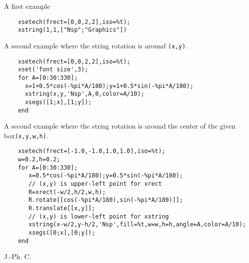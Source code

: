 \begin{examples}

\noindent A first example

  \begin{Verbatim}
    xsetech(frect=[0,0,2,2],iso=%t);
    xstring(1,1,["Nsp";"Graphics"])
  \end{Verbatim}

\noindent A second example where the string rotation is around \verb!(x,y)!.

  \begin{Verbatim}
    xsetech(frect=[0,0,2,2],iso=%t);
    xset('font size',3);
    for A=[0:30:330];
      x=1+0.5*cos(-%pi*A/180);y=1+0.5*sin(-%pi*A/180);
      xstring(x,y,'Nsp',A,0,color=A/10);
      xsegs([1;x],[1;y]);
    end
  \end{Verbatim}

\noindent A second example where the string rotation is around the center of the
  given box\verb!(x,y,w,h)!.

  \begin{Verbatim}
    xsetech(frect=[-1.0,-1.0,1.0,1.0],iso=%t);
    w=0.2,h=0.2;
    for A=[0:30:330];
       x=0.5*cos(-%pi*A/180);y=0.5*sin(-%pi*A/180);
       // (x,y) is upper-left point for xrect
       R=xrect(-w/2,h/2,w,h);
       R.rotate[[cos(-%pi*A/180),sin(-%pi*A/180)]];
       R.translate[[x,y]];
       // (x,y) is lower-left point for xstring
       xstring(x-w/2,y-h/2,'Nsp',fill=%t,w=w,h=h,angle=A,color=A/10);
       xsegs([0;x],[0;y]);
    end
  \end{Verbatim}

\end{examples}

\begin{manseealso}
     
\end{manseealso}


\begin{authors}
  J.-Ph. C.
\end{authors}

